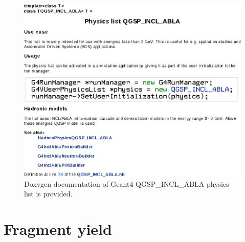 \documentclass[a4paper]{jpconf}
\begin{document}
\begin{figure}[h]
\begin{center}
\includegraphics[scale=0.80]{poster/images/inclAblaDoc.eps}
\caption{\label{label}Doxygen documentation of Geant4 {\sf QGSP\_\-INCL\_ABLA} physics list is provided.}
\end{center}
\end{figure}



\section{Fragment yield}
\end{document}
